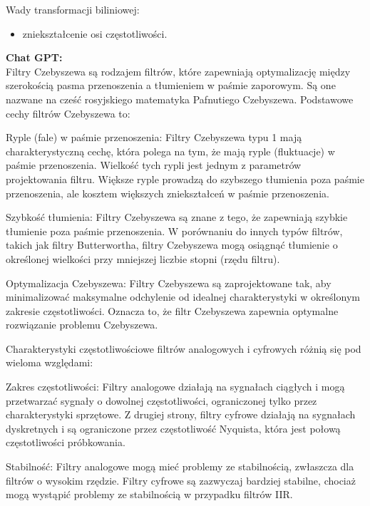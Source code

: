 \documentclass[10pt,a4paper,twoside,twocolumn]{article}%
\begin{document}
\begin{mdframed}[backgroundcolor=gray!20,]
Wady transformacji biliniowej:
\begin{itemize}
    \item zniekształcenie osi częstotliwości.
\end{itemize}
    
\textbf{Chat GPT:}\\
Filtry Czebyszewa są rodzajem filtrów, które zapewniają optymalizację między
szerokością pasma przenoszenia a tłumieniem w paśmie zaporowym. Są one nazwane
na cześć rosyjskiego matematyka Pafnutiego Czebyszewa. Podstawowe cechy filtrów
Czebyszewa to:

Ryple (fale) w paśmie przenoszenia: Filtry Czebyszewa typu 1 mają
charakterystyczną cechę, która polega na tym, że mają ryple (fluktuacje) w
paśmie przenoszenia. Wielkość tych rypli jest jednym z parametrów projektowania
filtru. Większe ryple prowadzą do szybszego tłumienia poza paśmie przenoszenia,
ale kosztem większych zniekształceń w paśmie przenoszenia.

Szybkość tłumienia: Filtry Czebyszewa są znane z tego, że zapewniają szybkie
tłumienie poza paśmie przenoszenia. W porównaniu do innych typów filtrów, takich
jak filtry Butterwortha, filtry Czebyszewa mogą osiągnąć tłumienie o określonej
wielkości przy mniejszej liczbie stopni (rzędu filtru).

Optymalizacja Czebyszewa: Filtry Czebyszewa są zaprojektowane tak, aby
minimalizować maksymalne odchylenie od idealnej charakterystyki w określonym
zakresie częstotliwości. Oznacza to, że filtr Czebyszewa zapewnia optymalne
rozwiązanie problemu Czebyszewa.

Charakterystyki częstotliwościowe filtrów analogowych i cyfrowych różnią się
pod wieloma względami:

Zakres częstotliwości: Filtry analogowe działają na sygnałach ciągłych i mogą
przetwarzać sygnały o dowolnej częstotliwości, ograniczonej tylko przez
charakterystyki sprzętowe. Z drugiej strony, filtry cyfrowe działają na
sygnałach dyskretnych i są ograniczone przez częstotliwość Nyquista, która jest
połową częstotliwości próbkowania.

Stabilność: Filtry analogowe mogą mieć problemy ze stabilnością, zwłaszcza dla
filtrów o wysokim rzędzie. Filtry cyfrowe są zazwyczaj bardziej stabilne,
chociaż mogą wystąpić problemy ze stabilnością w przypadku filtrów IIR.
\end{mdframed}
\end{document}
